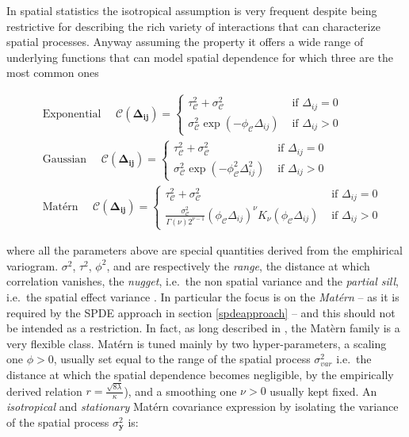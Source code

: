 \documentclass[
  12pt,
  a4paper,
  oneside]{book}
\theoremstyle{definition}
\theoremstyle{definition}
\theoremstyle{definition}
\theoremstyle{remark}
\begin{document}
In spatial statistics the isotropical assumption is very frequent despite being restrictive for describing the rich variety of interactions that can characterize spatial processes. Anyway assuming the property it offers a wide range of underlying functions that can model spatial dependence for which three are the most common ones \citep{Krainski2018}

\[
\begin{aligned}
&\text { Exponential } \quad \mathscr{C}(\mathbf{ \Delta_{i j}})=\left\{\begin{array}{cl}
\tau^{2}_{\mathscr{C}}+\sigma^{2}_{\mathscr{C}} & \text { if }  \Delta_{i j}=0 \\
\sigma^{2}_{\mathscr{C}} \exp (-\phi_{\mathscr{C}} \Delta_{i j}) & \text { if } \Delta_{i j}>0 
\end{array}\right.\\
&\text { Gaussian } \quad \mathscr{C}(\mathbf{ \Delta_{i j}})=\left\{\begin{array}{cl}
\tau^{2}_{\mathscr{C}}+\sigma^{2}_{\mathscr{C}} & \text { if } \Delta_{i j}=0 \\
\sigma^{2}_{\mathscr{C}} \exp \left(-\phi^{2}_{\mathscr{C}}  \Delta_{i j}^{2}\right) & \text { if } \Delta_{i j}>0 
\end{array}\right. \\
&\text { Matérn } \quad \mathscr{C}(\mathbf{ \Delta_{i j}})=\left\{\begin{array}{cl}
\tau^{2}_{\mathscr{C}}+\sigma^{2}_{\mathscr{C}} & \text { if } \Delta_{i j}=0 \\
\frac{\sigma^{2}_{\mathscr{C}}}{\Gamma(\nu) 2^{\nu-1}}(\phi_{\mathscr{C}}  \Delta_{i j})^{\nu} K_{\nu}(\phi_{\mathscr{C}}  \Delta_{i j}) & \text { if } \Delta_{i j}>0
\end{array}\right.
\end{aligned}
\]

where all the parameters above are special quantities derived from the emphirical variogram. \(\sigma^2\), \(\tau^2\), \(\phi^2\), and are respectively the \emph{range}, the distance at which correlation vanishes, the \emph{nugget}, i.e.~the non spatial variance and the \emph{partial sill}, i.e.~the spatial effect variance \citep{LecturePaci}.
In particular the focus is on the \emph{Matérn} -- as it is required by the SPDE approach in section \ref{spdeapproach} -- and this should not be intended as a restriction. In fact, as long described in \citet{gneiting2006geostatistical}, the Matèrn family is a very flexible class. Matérn is tuned mainly by two hyper-parameters, a scaling one \(\phi>0\), usually set equal to the range of the spatial process \(\sigma^{2}_{var}\) i.e.~the distance at which the spatial dependence becomes negligible, by the empirically derived relation \(r =\frac{\sqrt{8 \lambda}}{\kappa}\)), and a smoothing one \(\nu>0\) usually kept fixed. An \emph{isotropical} and \emph{stationary} Matérn covariance expression by isolating the variance of the spatial process \(\sigma_{\mathscr{\boldsymbol{\mathbf{y}}}}^{2}\) is:
\end{document}
